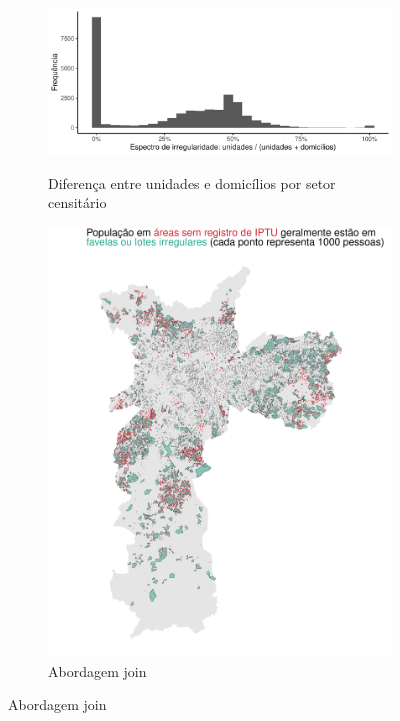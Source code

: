 \begin{figure}[h]
    \caption{Inconsistências entre dados do IPTU e do censo}
    \centering
    \begin{subfigure}{.8\linewidth}
        \centering
        \caption{Diferença entre unidades e domicílios por setor censitário}
        \includegraphics[width = \linewidth]{imagens/disparidade_censoIPTU.pdf}
        \label{fig:balanco}
    \end{subfigure}
    \begin{subfigure}[t]{0.45\linewidth}
        \caption{Abordagem join}
        \centering
        \includegraphics[width = \linewidth]{imagens/mapa_pontos.pdf}

\end{subfigure}
\end{figure}
